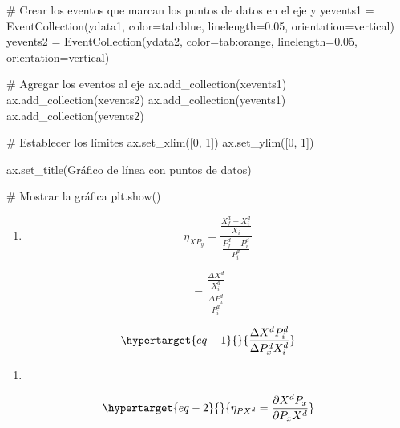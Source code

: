 \documentclass[
  a4paper,
]{article}
\newenvironment{Shaded}{}{}
\newcommand{\CommentTok}[1]{\textcolor[rgb]{0.42,0.45,0.49}{#1}}
\newcommand{\DecValTok}[1]{\textcolor[rgb]{0.00,0.36,0.77}{#1}}
\newcommand{\FloatTok}[1]{\textcolor[rgb]{0.00,0.36,0.77}{#1}}
\newcommand{\NormalTok}[1]{\textcolor[rgb]{0.14,0.16,0.18}{#1}}
\newcommand{\OperatorTok}[1]{\textcolor[rgb]{0.14,0.16,0.18}{#1}}
\newcommand{\StringTok}[1]{\textcolor[rgb]{0.01,0.18,0.38}{#1}}
\providecommand{\tightlist}{%
  \setlength{\itemsep}{0pt}\setlength{\parskip}{0pt}}\usepackage{longtable,booktabs,array}
\begin{document}
\begin{Shaded}
\begin{Highlighting}[]
\CommentTok{\# Crear los eventos que marcan los puntos de datos en el eje y}
\NormalTok{yevents1 }\OperatorTok{=}\NormalTok{ EventCollection(ydata1, color}\OperatorTok{=}\StringTok{\textquotesingle{}tab:blue\textquotesingle{}}\NormalTok{, linelength}\OperatorTok{=}\FloatTok{0.05}\NormalTok{, orientation}\OperatorTok{=}\StringTok{\textquotesingle{}vertical\textquotesingle{}}\NormalTok{)}
\NormalTok{yevents2 }\OperatorTok{=}\NormalTok{ EventCollection(ydata2, color}\OperatorTok{=}\StringTok{\textquotesingle{}tab:orange\textquotesingle{}}\NormalTok{, linelength}\OperatorTok{=}\FloatTok{0.05}\NormalTok{, orientation}\OperatorTok{=}\StringTok{\textquotesingle{}vertical\textquotesingle{}}\NormalTok{)}

\CommentTok{\# Agregar los eventos al eje}
\NormalTok{ax.add\_collection(xevents1)}
\NormalTok{ax.add\_collection(xevents2)}
\NormalTok{ax.add\_collection(yevents1)}
\NormalTok{ax.add\_collection(yevents2)}

\CommentTok{\# Establecer los límites}
\NormalTok{ax.set\_xlim([}\DecValTok{0}\NormalTok{, }\DecValTok{1}\NormalTok{])}
\NormalTok{ax.set\_ylim([}\DecValTok{0}\NormalTok{, }\DecValTok{1}\NormalTok{])}

\NormalTok{ax.set\_title(}\StringTok{\textquotesingle{}Gráfico de línea con puntos de datos\textquotesingle{}}\NormalTok{)}

\CommentTok{\# Mostrar la gráfica}
\NormalTok{plt.show()}
\end{Highlighting}
\end{Shaded}

\begin{enumerate}
\def\labelenumi{\arabic{enumi}.}
\tightlist
\item
  \[
  \eta _{XP_y} = \frac{\frac {X_f^d - X_i^d}{X_i}}{\frac {P_f^d - P_i^d}{P_i^d}}
  \]
\end{enumerate}

\[
= \frac{\frac{\Delta X^d}{X_i^d}}{\frac{\Delta P_x^d}{P_i^d}}
\]

\begin{equation}\protect\hypertarget{eq-1}{}{
\frac{\Delta X^d P_i^d}{\Delta P_x^d X_i^d}
}\label{eq-1}\end{equation}

\begin{enumerate}
\def\labelenumi{\arabic{enumi}.}
\setcounter{enumi}{1}
\tightlist
\item
\end{enumerate}

\begin{equation}\protect\hypertarget{eq-2}{}{
\eta _{PX^d} = \frac{\partial X^d P_x}{\partial P_x X^d}
}\label{eq-2}\end{equation}
\end{document}
